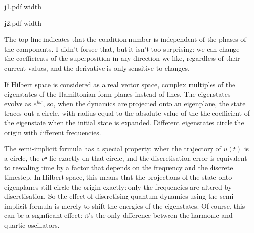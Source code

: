 \centerline{\XeTeXpicfile j1.pdf width \hsize}

\centerline{\XeTeXpicfile j2.pdf width \hsize}

The top line indicates that the condition number is independent of the phases of the components.  I didn't forsee that, but it isn't too surprising: we can change the coefficients of the superposition in any direction we like, regardless of their current values, and the derivative is only sensitive to changes.


If Hilbert space is considered as a real vector space, complex multiples of the eigenstates of the Hamiltonian form planes instead of lines.  The eigenstates evolve as $e^{iωt}$, so, when the dynamics are projected onto an eigenplane, the state traces out a circle, with radius equal to the absolute value of the the coefficient of the eigenstate when the initial state is expanded.  Different eigenstates circle the origin with different frequencies.

The semi-implicit formula has a special property: when the trajectory of $u(t)$ is a circle, the $vⁿ$ lie exactly on that circle, and the discretisation error is equivalent to rescaling time by a factor that depends on the frequency and the discrete timestep.  In Hilbert space, this means that the projections of the state onto eigenplanes still circle the origin exactly: only the frequencies are altered by discretisation.  So the effect of discretising quantum dynamics using the semi-implicit formula is merely to shift the energies of the eigenstates.  Of course, this can be a significant effect: it's the only difference between the harmonic and quartic oscillators.


